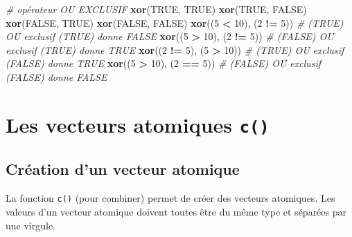 \documentclass[
]{book}
\newenvironment{Shaded}{\begin{snugshade}}{\end{snugshade}}
\newcommand{\CommentTok}[1]{\textcolor[rgb]{0.56,0.35,0.01}{\textit{#1}}}
\newcommand{\ConstantTok}[1]{\textcolor[rgb]{0.56,0.35,0.01}{#1}}
\newcommand{\DecValTok}[1]{\textcolor[rgb]{0.00,0.00,0.81}{#1}}
\newcommand{\FunctionTok}[1]{\textcolor[rgb]{0.13,0.29,0.53}{\textbf{#1}}}
\newcommand{\NormalTok}[1]{#1}
\newcommand{\SpecialCharTok}[1]{\textcolor[rgb]{0.81,0.36,0.00}{\textbf{#1}}}
\begin{document}
\begin{Shaded}
\begin{Highlighting}[]
\CommentTok{\# opérateur OU EXCLUSIF}
\FunctionTok{xor}\NormalTok{(}\ConstantTok{TRUE}\NormalTok{, }\ConstantTok{TRUE}\NormalTok{)}
\FunctionTok{xor}\NormalTok{(}\ConstantTok{TRUE}\NormalTok{, }\ConstantTok{FALSE}\NormalTok{)}
\FunctionTok{xor}\NormalTok{(}\ConstantTok{FALSE}\NormalTok{, }\ConstantTok{TRUE}\NormalTok{)}
\FunctionTok{xor}\NormalTok{(}\ConstantTok{FALSE}\NormalTok{, }\ConstantTok{FALSE}\NormalTok{)}
\FunctionTok{xor}\NormalTok{((}\DecValTok{5} \SpecialCharTok{\textless{}} \DecValTok{10}\NormalTok{), (}\DecValTok{2} \SpecialCharTok{!=} \DecValTok{5}\NormalTok{)) }\CommentTok{\# (TRUE) OU exclusif (TRUE) donne FALSE}
\FunctionTok{xor}\NormalTok{((}\DecValTok{5} \SpecialCharTok{\textgreater{}} \DecValTok{10}\NormalTok{), (}\DecValTok{2} \SpecialCharTok{!=} \DecValTok{5}\NormalTok{)) }\CommentTok{\# (FALSE) OU exclusif (TRUE) donne TRUE}
\FunctionTok{xor}\NormalTok{((}\DecValTok{2} \SpecialCharTok{!=} \DecValTok{5}\NormalTok{), (}\DecValTok{5} \SpecialCharTok{\textgreater{}} \DecValTok{10}\NormalTok{)) }\CommentTok{\# (TRUE) OU exclusif (FALSE) donne TRUE}
\FunctionTok{xor}\NormalTok{((}\DecValTok{5} \SpecialCharTok{\textgreater{}} \DecValTok{10}\NormalTok{), (}\DecValTok{2} \SpecialCharTok{==} \DecValTok{5}\NormalTok{)) }\CommentTok{\# (FALSE) OU exclusif (FALSE) donne FALSE}
\end{Highlighting}
\end{Shaded}

\section{\texorpdfstring{Les vecteurs atomiques \texttt{c()}}{Les vecteurs atomiques c()}}\label{les-vecteurs-atomiques-c}

\subsection{Création d'un vecteur atomique}\label{cruxe9ation-dun-vecteur-atomique}

La fonction \texttt{c()} (pour combiner) permet de créer des vecteurs atomiques.
Les valeurs d'un vecteur atomique doivent toutes être du même type et séparées par une virgule.
\end{document}
